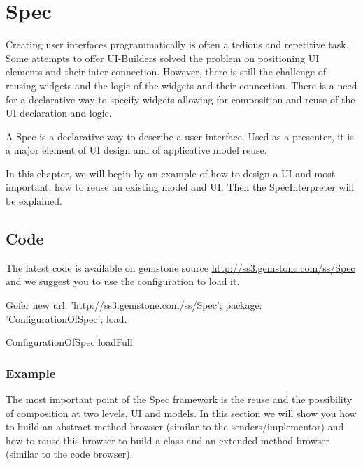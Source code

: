 \documentclass[a4paper,10pt,twoside]{book}
\begin{document}
\fi
\sloppy

\chapter{Spec}

Creating user interfaces programmatically is often a tedious and repetitive task. Some attempts to offer UI-Builders solved the problem on positioning UI elements and their inter connection. However, there is still the challenge of reusing widgets and the  logic of the widgets and their connection. There is a need for a declarative way to specify widgets allowing for composition and reuse of the UI declaration and logic. 

A Spec is a declarative way to describe a user interface. Used as a presenter, it is a major element of UI design and of applicative model reuse.

In this chapter, we will begin by an example of how to design a UI and most important, how to reuse an existing model and UI. Then the SpecInterpreter will be explained.

\section{Code}

The latest code is available on gemstone source \url{http://ss3.gemstone.com/ss/Spec} and we suggest you to use the configuration to load it.

\begin{code}{}
Gofer new
	url: 'http://ss3.gemstone.com/ss/Spec';
	package: 'ConfigurationOfSpec';
	load.
	
ConfigurationOfSpec loadFull.	
\end{code}

\subsection{Example}
The most important point of the Spec framework is the reuse and the possibility of composition at two levels, UI and models. In this section we will show you how to build an abstract method browser (similar to the senders/implementor) and how to reuse this browser to build a class and an extended method browser (similar to the code browser).
\end{document}

